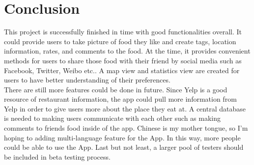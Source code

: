 \chapter{Conclusion}

This project is successfully finished in time with good functionalities overall. It could provide users to take picture of food they like and create tags, location information, rates, and comments to the food. At the time, it provides convenient methods for users to share those food with their friend by social media such as Facebook, Twitter, Weibo etc.. A map view and statistics view are created for users to have better understanding of their preferences. \\

There are still more features could be done in future. Since Yelp is a good resource of restaurant information, the app could pull more information from Yelp in order to give users more about the place they eat at. A central database is needed to making users communicate with each other such as making comments to friends food inside of the app. Chinese is my mother tongue, so I'm hoping to adding multi-language feature for the App. In this way, more people could be able to use the App. Last but not least, a larger pool of testers should be included in beta testing process.
